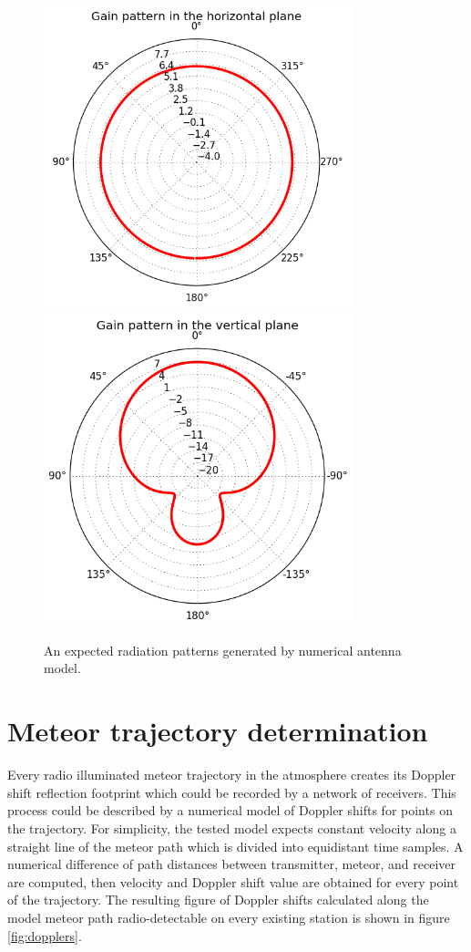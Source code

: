 \documentclass[twoside]{ctuthesis}
\theoremstyle{plain}
\theoremstyle{definition}
\theoremstyle{note}
\begin{document}
\begin{figure}
 \begin{center}
 \includegraphics[width=90mm ]{./img/SC_QHA_rp_horizontal.png} 
 \includegraphics[width=90mm ]{./img/SC_QHA_rp_vertical.png}
 \caption{An expected radiation patterns generated by numerical antenna model.}
  \label{fig:QHA_antenna_RP} 
 \end{center}
\end{figure}




\section{Meteor trajectory determination}

Every radio illuminated meteor trajectory in the atmosphere creates its Doppler shift reflection footprint which could be recorded by a network of receivers.  This process could be described by a numerical model of Doppler shifts for points on the trajectory. For simplicity, the tested model expects constant velocity along a straight line of the meteor path which is divided into equidistant time samples. A numerical difference of path distances between transmitter, meteor, and receiver are computed, then velocity and Doppler shift value are obtained for every point of the trajectory. 
The resulting figure of Doppler shifts calculated along the model meteor path radio-detectable on every existing station is shown in figure \ref{fig:dopplers}. 
\end{document}
